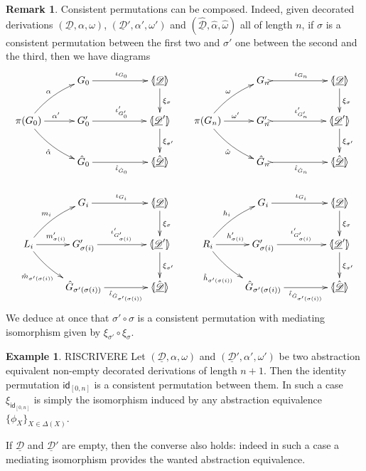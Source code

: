 \documentclass[a4paper]{article}
\newcommand{\id}[1]{\mathsf{id}_{#1}}
\newcommand{\dder}[1]{\mathscr{#1}}
\newcommand{\der}[1]{\underline{\dder{#1}}}
\newcommand{\lpro}{\langle \hspace{-1.85pt}[}
\newcommand{\rpro}{]\hspace{-1.85pt}\rangle}
\newcommand{\tpro}[1]{\lpro \der{#1}\rpro}
\theoremstyle{definition}
\newtheorem{remark}[theorem]{Remark}
\newtheorem{example}[theorem]{Example}
\begin{document}
\begin{remark}\label{rem:comp} Consistent permutations can be composed. Indeed, given decorated derivations $(\der{D}, \alpha, \omega)$, $(\der{D}', \alpha', \omega')$ and $(\der{\hat{D}}, \hat{\alpha}, \hat{\omega})$ all of length $n$, if $\sigma$ is a consistent permutation between the first two and $\sigma'$ one between the second and the third, then  we have diagrams
	\[\xymatrix@C=18pt{ & G_0 \ar[rr]^{\iota_{G_0}} &&\tpro{D} \ar[d]^{\xi_\sigma}&  &  G_{n} \ar@{>->}[rr]^{\iota_{ G_{n}}} &&\tpro{D} \ar[d]^{\xi_\sigma} \\ \pi(G_0) \ar@/_.2cm/[dr]_{\hat{\alpha}}\ar@/^.2cm/[ur]^{\alpha} \ar[r]^{\alpha'} &G'_0 \ar[rr]^{\iota'_{G'_0}}  &&\lpro \der{D}'  \rpro \ar[d]^{\xi_{\sigma'}}&\pi({ G_{n}})\ar@/_.2cm/[dr]_{\hat{\omega}}\ar@/^.2cm/[ur]^{\omega} \ar[r]^{\omega'} & { G'_{n}} \ar@{>->}[rr]^{\iota'_{{ G'_{n}}}} && \lpro \der{D}' \rpro \ar[d]^{\xi_{\sigma'}}\\ &\hat{G}_0  \ar[rr]_{\hat{\iota}_{\hat{G}_0}}&& \lpro \hat{\der{D}}\rpro  && \hat{G}_n \ar@{>->}[rr]_{\hat{\iota}_{\hat{G}_n}}&& \lpro \hat{\der{D}} \rpro \\& G_i \ar[rr]^{\iota_{G_i}} &&\tpro{D} \ar[d]^{\xi_\sigma}&  &  G_i \ar[rr]^{\iota_{G_i}} &&\tpro{D} \ar[d]^{\xi_\sigma} \\ L_i \ar@/_.2cm/[dr]_{\hat{m}_{\sigma'(\sigma(i))}}\ar@/^.2cm/[ur]^{m_i} \ar[r]^{m'_{\sigma(i)}} &G'_{\sigma(i)} \ar[rr]^{\iota'_{G'_{\sigma(i)}}}  &&\lpro \der{D}'  \rpro \ar[d]^{\xi_{\sigma'}}&R_i \ar@/_.2cm/[dr]_{\hat{h}_{\sigma'(\sigma(i))}}\ar@/^.2cm/[ur]^{h_i} \ar[r]^{h'_{\sigma(i)}} & G'_{\sigma(i)} \ar[rr]^{\iota'_{G'_{\sigma(i)}}} && \lpro \der{D}' \rpro \ar[d]^{\xi_{\sigma'}}\\ &\hat{G}_{\sigma'(\sigma(i))}  \ar[rr]_-{\hat{\iota}_{\hat{G}_{\sigma'(\sigma(i))}}}&& \lpro \hat{\der{D}}\rpro  && \hat{G}_{\sigma'(\sigma(i))} \ar[rr]_-{\hat{\iota}_{\hat{G}_{\sigma'(\sigma(i))}}}&& \lpro \hat{\der{D}} \rpro	}\]
	We deduce at once that $\sigma'\circ \sigma$ is a consistent permutation with mediating isomorphism given by $\xi_{\sigma'} \circ \xi_\sigma$.
\end{remark}

\begin{example} RISCRIVERE Let $(\der{D}, \alpha, \omega)$ and $(\der{D}', \alpha', \omega')$ be two abstraction equivalent non-empty decorated derivations of length $n+1$. Then the identity permutation $\id{[0,n]}$ is a consistent permutation between them. In such a case $\xi_{\id{[0,n]}}$ is simply the isomorphism induced by any abstraction equivalence $\{\phi_X\}_{X\in \Delta(X)}$.

	If $\der{D}$ and $\der{D}'$ are empty, then the converse also holds: indeed in such a case a mediating isomorphism provides the wanted abstraction equivalence.
\end{example}
\end{document}
